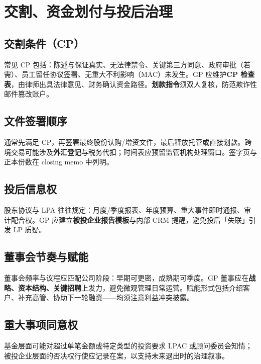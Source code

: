 \chapter{交割、资金划付与投后治理}

\section{交割条件（CP）}

常见 CP 包括：陈述与保证真实、无法律禁令、关键第三方同意、政府审批（若需）、员工留任协议签署、无重大不利影响（MAC）未发生。GP 应维护\textbf{CP 检查表}，由律师出具法律意见、财务确认资金路径。\textbf{划款指令}须双人复核，防范欺诈性邮件篡改账户。

\section{文件签署顺序}

通常先满足 CP，再签署最终股份认购/增资文件，最后释放托管或直接划款。跨境交易可能涉及\textbf{外汇登记}与税务代扣；时间表应预留监管机构处理窗口。签字页与正本份数在 closing memo 中列明。

\section{投后信息权}

股东协议与 LPA 往往规定：月度/季度报表、年度预算、重大事件即时通报、审计配合权。GP 应建立\textbf{被投企业报告模板}与内部 CRM 提醒，避免投后「失联」引发 LP 质疑。

\section{董事会节奏与赋能}

董事会频率与议程应匹配公司阶段：早期可更密，成熟期可季度。GP 董事应在\textbf{战略、资本结构、关键招聘}上发力，避免微观管理日常运营。赋能形式包括介绍客户、补充高管、协助下一轮融资——均须注意利益冲突披露。

\section{重大事项同意权}

基金层面可能对超过单笔金额或特定类型的投资要求 LPAC 或顾问委员会知情；被投企业层面的否决权行使应记录在案，以支持未来退出时的治理叙事。
